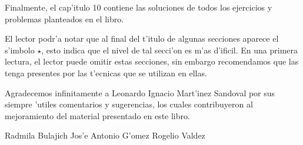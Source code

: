 Finalmente,  el cap'itulo 10 contiene las soluciones de todos los ejercicios y   
problemas planteados en el libro.

El lector podr'a notar que al final del t'itulo de algunas secciones aparece el s'imbolo $\star$, esto indica  
que el nivel de  tal secci'on  es m'as d'ificil.  En una primera lectura, el lector puede 
omitir estas secciones, sin embargo recomendamos que las tenga presentes por las t'ecnicas que se utilizan en ellas. 


Agradecemos infinitamente a Leonardo Ignacio Mart'inez Sandoval por sus \linebreak siempre 'utiles  comentarios y 
sugerencias, los cuales contribuyeron al mejoramiento del material presentado en este  libro.   

\vei

Radmila Bulajich \hspace{.75in} Jos'e Antonio G'omez \hspace{.75in}
Rogelio Valdez



